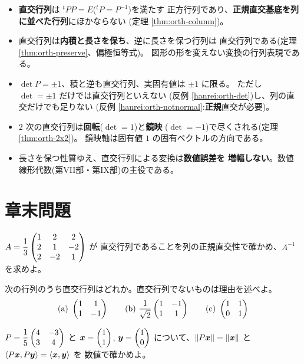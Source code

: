 \begin{matome}
\begin{itemize}
\item \textbf{直交行列}は ${}^t\!P P = E$(${}^t\!P = P^{-1}$)を満たす
正方行列であり、\textbf{正規直交基底を列に並べた行列}にほかならない
(定理 \ref{thm:orth-column})。
\item 直交行列は\textbf{内積と長さを保ち}、逆に長さを保つ行列は
直交行列である(定理 \ref{thm:orth-preserve}、偏極恒等式)。
図形の形を変えない変換の行列表現である。
\item $\det P = \pm 1$、積と逆も直交行列、実固有値は $\pm 1$ に限る。
ただし $\det = \pm 1$ だけでは直交行列といえない
(反例 \ref{hanrei:orth-det})し、列の直交だけでも足りない
(反例 \ref{hanrei:orth-notnormal}:\textbf{正規}直交が必要)。
\item $2$ 次の直交行列は\textbf{回転}($\det = 1$)と\textbf{鏡映}
($\det = -1$)で尽くされる(定理 \ref{thm:orth-2x2})。
鏡映軸は固有値 $1$ の固有ベクトルの方向である。
\item 長さを保つ性質ゆえ、直交行列による変換は\textbf{数値誤差を
増幅しない}。数値線形代数(第VII部・第IX部)の主役である。
\end{itemize}
\end{matome}

\section*{章末問題}

\begin{mondai}[基本]\label{q:orth-ex1}
$A = \dfrac{1}{3}\begin{pmatrix}1 & 2 & 2 \\ 2 & 1 & -2 \\ 2 & -2 & 1\end{pmatrix}$ が
直交行列であることを列の正規直交性で確かめ、$A^{-1}$ を求めよ。
\end{mondai}

\begin{mondai}[基本]\label{q:orth-ex2}
次の行列のうち直交行列はどれか。直交行列でないものは理由を述べよ。
\[
\text{(a)}\ \begin{pmatrix}1 & 1 \\ 1 & -1\end{pmatrix} \qquad
\text{(b)}\ \frac{1}{\sqrt{2}}\begin{pmatrix}1 & -1 \\ 1 & 1\end{pmatrix} \qquad
\text{(c)}\ \begin{pmatrix}1 & 1 \\ 0 & 1\end{pmatrix}
\]
\end{mondai}

\begin{mondai}[基本]\label{q:orth-ex3}
$P = \dfrac{1}{5}\begin{pmatrix}4 & -3 \\ 3 & 4\end{pmatrix}$ と $\bm{x} = \begin{pmatrix}1 \\ 1\end{pmatrix}$,
$\bm{y} = \begin{pmatrix}1 \\ 0\end{pmatrix}$ について、$\|P\bm{x}\| = \|\bm{x}\|$ と
$\langle P\bm{x}, P\bm{y} \rangle = \langle \bm{x}, \bm{y} \rangle$ を
数値で確かめよ。
\end{mondai}

